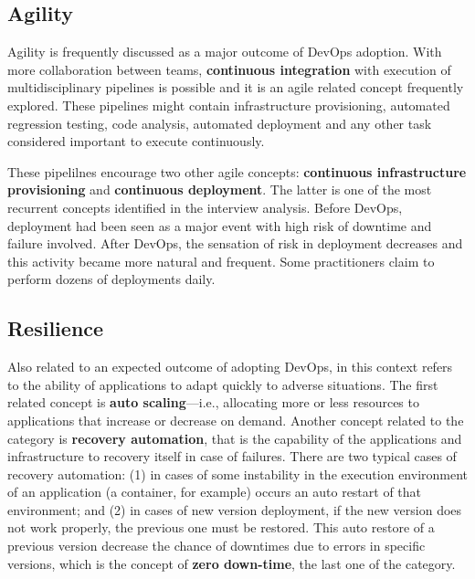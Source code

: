 \subsection{Agility}

Agility is frequently discussed as a major outcome of DevOps adoption. With more
collaboration between teams, \textbf{continuous integration} with execution of
multidisciplinary pipelines is possible and it is an agile related concept
frequently explored. These pipelines might contain
infrastructure provisioning, automated regression testing, code analysis,
automated deployment and any other task considered important to
execute continuously.

These pipelilnes encourage two other agile concepts: \textbf{continuous
infrastructure provisioning} and \textbf{continuous deployment}. The latter is
one of the most recurrent concepts identified in the interview analysis. Before
DevOps, deployment had been seen as a major event with high risk of downtime and
failure involved. After DevOps, the sensation of risk in deployment decreases
and this activity became more natural and frequent. Some practitioners claim
to perform dozens of deployments daily.

\subsection*{Resilience}

Also related to an expected outcome of adopting DevOps,  in this
context refers to the ability of applications to adapt quickly to adverse situations.
The first related concept is \textbf{auto scaling}---i.e.,
allocating more or less resources to applications that increase or
decrease on demand. Another concept related to
the  category is \textbf{recovery automation}, that is
the capability of the applications and infrastructure to recovery itself in case of
failures. There are two typical cases of recovery automation: (1) in cases
of some instability in the execution environment of an application (a
container, for example) occurs an auto restart of that environment; and (2) in
cases of new version deployment, if the new version does not work properly, the
previous one must be restored. This auto restore of a previous version
decrease the chance of downtimes due to errors in specific versions, which
is the concept of \textbf{zero down-time}, the last one of the  category.


